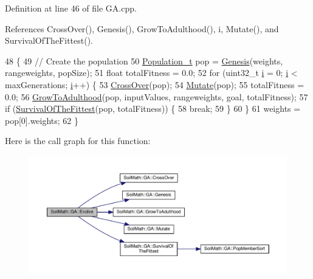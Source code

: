 Definition at line 46 of file G\+A.\+cpp.



References Cross\+Over(), Genesis(), Grow\+To\+Adulthood(), i, Mutate(), and Survival\+Of\+The\+Fittest().


\begin{DoxyCode}
48                                                            \{
49   \textcolor{comment}{// Create the population}
50   \hyperlink{_soil_math_types_8h_a8d2d4c736cf817d048a2d66dec8b12ec}{Population\_t} pop = \hyperlink{class_soil_math_1_1_g_a_a96cfe7cc5b3028a66b0136e72ea38cbc}{Genesis}(weights, rangeweights, popSize);
51   \textcolor{keywordtype}{float} totalFitness = 0.0;
52   \textcolor{keywordflow}{for} (uint32\_t \hyperlink{_comparision_pictures_2_createtest_image_8m_a6f6ccfcf58b31cb6412107d9d5281426}{i} = 0; \hyperlink{_comparision_pictures_2_createtest_image_8m_a6f6ccfcf58b31cb6412107d9d5281426}{i} < maxGenerations; \hyperlink{_comparision_pictures_2_createtest_image_8m_a6f6ccfcf58b31cb6412107d9d5281426}{i}++) \{
53     \hyperlink{class_soil_math_1_1_g_a_abf408d603b2afb188a6d265eb6309b69}{CrossOver}(pop);
54     \hyperlink{class_soil_math_1_1_g_a_a489f2afd54086c14f45b654aeec0fe3c}{Mutate}(pop);
55     totalFitness = 0.0;
56     \hyperlink{class_soil_math_1_1_g_a_aff791f50f889beb74e854942f8883b58}{GrowToAdulthood}(pop, inputValues, rangeweights, goal, totalFitness);
57     \textcolor{keywordflow}{if} (\hyperlink{class_soil_math_1_1_g_a_ac2c10631815408d044738f678c67e98b}{SurvivalOfTheFittest}(pop, totalFitness)) \{
58       \textcolor{keywordflow}{break};
59     \}
60   \}
61   weights = pop[0].weights;
62 \}
\end{DoxyCode}


Here is the call graph for this function\+:\nopagebreak
\begin{figure}[H]
\begin{center}
\leavevmode
\includegraphics[width=350pt]{class_soil_math_1_1_g_a_aca448f36c1f98b4906d0754cf354cccf_cgraph}
\end{center}
\end{figure}



